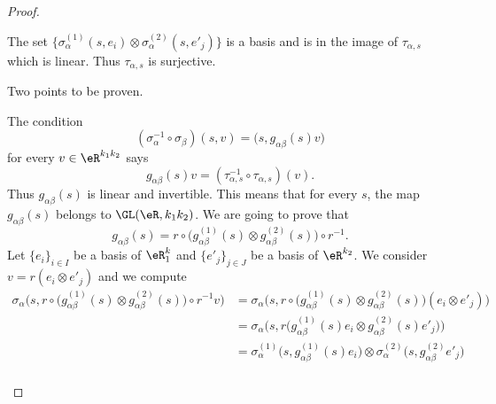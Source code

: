 \begin{proof}
\begin{subproof}
\begin{subproof}
			\spitem[Surjective]
			The set \(			\{ \sigma_{\alpha}^{(1)}(s,e_i)\otimes \sigma_{\alpha}^{(2)}(s,e'_j) \}  \) is a basis and is in the image of \( \tau_{\alpha,s}\) which is linear. Thus \( \tau_{\alpha,s}\) is surjective.
		\end{subproof}
		Two points to be proven.
		\begin{subproof}
			The condition
			\begin{equation}
				(\sigma_{\alpha}^{-1}\circ\sigma_{\beta})(s,v)=\big( s,g_{\alpha\beta}(s)v \big)
			\end{equation}
			for every \( v\in \eR^{k_1k_2}\) says
			\begin{equation}
				g_{\alpha\beta}(s)v=(\tau_{\alpha,s}^{-1}\circ\tau_{\alpha,s})(v).
			\end{equation}
			Thus \( g_{\alpha\beta}(s)\) is linear and invertible. This means that for every \( s\), the map \( g_{\alpha\beta}(s)\) belongs to \(\GL(\eR, k_1k_2)\).
			We are going to prove that
			\begin{equation}\label{EQooAUMXooCoqPTO}
				g_{\alpha\beta}(s)=r\circ\big( g_{\alpha\beta}^{(1)}(s)\otimes g_{\alpha\beta}^{(2)}(s) \big)\circ r^{-1}.
			\end{equation}
			Let \( \{ e_i \}_{i\in I}\) be a basis of \( \eR^k_1\) and \( \{ e'_j \}_{j\in J}\) be a basis of \( \eR^{k_2}\). We consider \( v=r(e_i\otimes e'_j)\) and we compute
			\begin{subequations}		\label{EQSooUIMFooMBbBvp}
				\begin{align}
					\sigma_{\alpha}\Big( s,  r\circ\big( g_{\alpha\beta}^{(1)}(s)\otimes g_{\alpha\beta}^{(2)}(s) \big)\circ r^{-1}v \Big)
					 & =\sigma_{\alpha}\Big(  s, r\circ\big( g_{\alpha\beta}^{(1)}(s)\otimes g_{\alpha\beta}^{(2)}(s) \big)(e_i\otimes e'_j)   \Big)                                                          \\
					 & =\sigma_{\alpha}\Big( s,r\big( g_{\alpha\beta}^{(1)}(s)e_i\otimes g_{\alpha\beta}^{(2)}(s)e'_j \big) \Big)                                                                             \\
					 & = \sigma_{\alpha}^{(1)}\big( s,g_{\alpha\beta}^{(1)}(s)e_i \big)\otimes \sigma_{\alpha}^{(2)}\big( s,g_{\alpha\beta}^{(2)}e'_j \big)                                                   \\

\end{align}
\end{subequations}
\end{subproof}
\end{subproof}
\end{proof}
